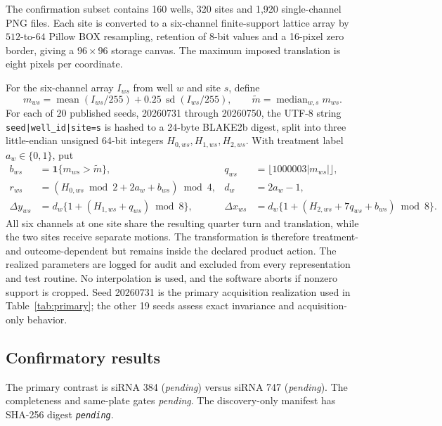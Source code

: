 \documentclass[11pt]{article}
\theoremstyle{plain}
\theoremstyle{definition}
\numberwithin{equation}{section}
\newcommand{\1}{\mathbf 1}
\newcommand{\pending}{\textnormal{\textit{pending}}}
\providecommand{\RxTreatmentA}{\pending}
\providecommand{\RxTreatmentB}{\pending}
\providecommand{\RxPlateAudit}{\pending}
\providecommand{\RxManifestHash}{\pending}
\providecommand{\RxNuisanceSeeds}{20}
\begin{document}
The confirmation subset contains 160 wells, 320 sites and 1,920 single-channel
PNG files. Each site is converted to a six-channel finite-support lattice array
by $512$-to-$64$ Pillow BOX resampling, retention of 8-bit values and a
16-pixel zero border, giving a $96\times96$ storage canvas. The maximum imposed
translation is eight pixels per coordinate.

For the six-channel array $I_{ws}$ from well $w$ and site $s$, define
\[
m_{ws}=\operatorname{mean}(I_{ws}/255)
+0.25\,\operatorname{sd}(I_{ws}/255),
\qquad
\widetilde m=\operatorname{median}_{w,s}m_{ws}.
\]
For each of $\RxNuisanceSeeds$ published seeds, 20260731 through 20260750, the
UTF-8 string \texttt{seed|well\_id|}\allowbreak\texttt{site=s} is hashed to a
24-byte BLAKE2b digest, split into three little-endian unsigned 64-bit integers
$H_{0,ws},H_{1,ws},H_{2,ws}$. With treatment label
$a_w\in\{0,1\}$, put
\[
\begin{aligned}
b_{ws}&=\1\{m_{ws}>\widetilde m\},&
q_{ws}&=\lfloor1000003|m_{ws}|\rfloor,\\
r_{ws}&=(H_{0,ws}\bmod2+2a_w+b_{ws})\bmod4,&
d_w&=2a_w-1,\\
\Delta y_{ws}&=d_w\{1+(H_{1,ws}+q_{ws})\bmod8\},&
\Delta x_{ws}&=d_w\{1+(H_{2,ws}+7q_{ws}+b_{ws})\bmod8\}.
\end{aligned}
\]
All six channels at one site share the resulting quarter turn and translation,
while the two sites receive separate motions. The transformation is therefore
treatment- and outcome-dependent but remains inside the declared product
action. The realized parameters are logged for audit and excluded from every
representation and test routine. No interpolation is used, and the software
aborts if nonzero support is cropped. Seed 20260731 is the primary acquisition
realization used in Table~\ref{tab:primary}; the other 19 seeds assess exact
invariance and acquisition-only behavior.

\subsection{Confirmatory results}

The primary contrast is siRNA 384 (\RxTreatmentA) versus siRNA 747
(\RxTreatmentB). The completeness and same-plate gates \RxPlateAudit. The
discovery-only manifest has SHA-256 digest
{\scriptsize\texttt{\RxManifestHash}}.
\end{document}
